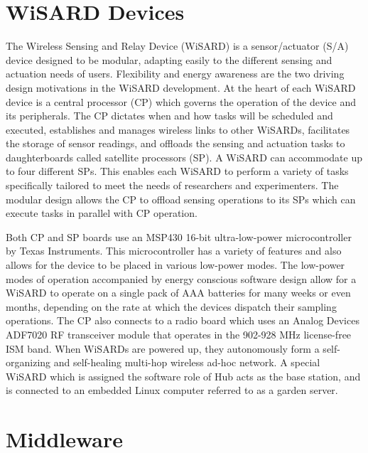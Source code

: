 \section{WiSARD Devices}
The Wireless Sensing and Relay Device (WiSARD) is a sensor/actuator (S/A)  device designed to be modular, adapting easily to the different sensing and actuation needs of users. Flexibility and energy awareness are the two driving design motivations in the WiSARD development. At the heart of each WiSARD device is a central processor (CP) which governs the operation of the device and its peripherals. The CP dictates when and how tasks will be scheduled and executed, establishes and manages wireless links to other WiSARDs, facilitates the storage of sensor readings, and offloads the sensing and actuation tasks to daughterboards called satellite processors (SP). A WiSARD can accommodate up to four different SPs. This enables each WiSARD to perform a variety of tasks specifically tailored to meet the needs of researchers and experimenters. The modular design allows the CP to offload sensing operations to its SPs which can execute tasks in parallel with CP operation. 

Both CP and SP boards use an MSP430 16-bit ultra-low-power microcontroller by Texas Instruments. This microcontroller has a variety of features and also allows for the device to be placed in various low-power modes. The low-power modes of operation accompanied by energy conscious software design allow for a WiSARD to operate on a single pack of AAA batteries for many weeks or even months, depending on the rate at which the devices dispatch their sampling operations. The CP also connects to a radio board which uses an Analog Devices ADF7020 RF transceiver module that operates in the 902-928 MHz license-free ISM band.  When WiSARDs are powered up, they autonomously form a self-organizing and self-healing multi-hop wireless ad-hoc network. A special WiSARD which is assigned the software role of Hub acts as the base station, and is connected to an embedded Linux computer referred to as a garden server. 

\section{Middleware}

